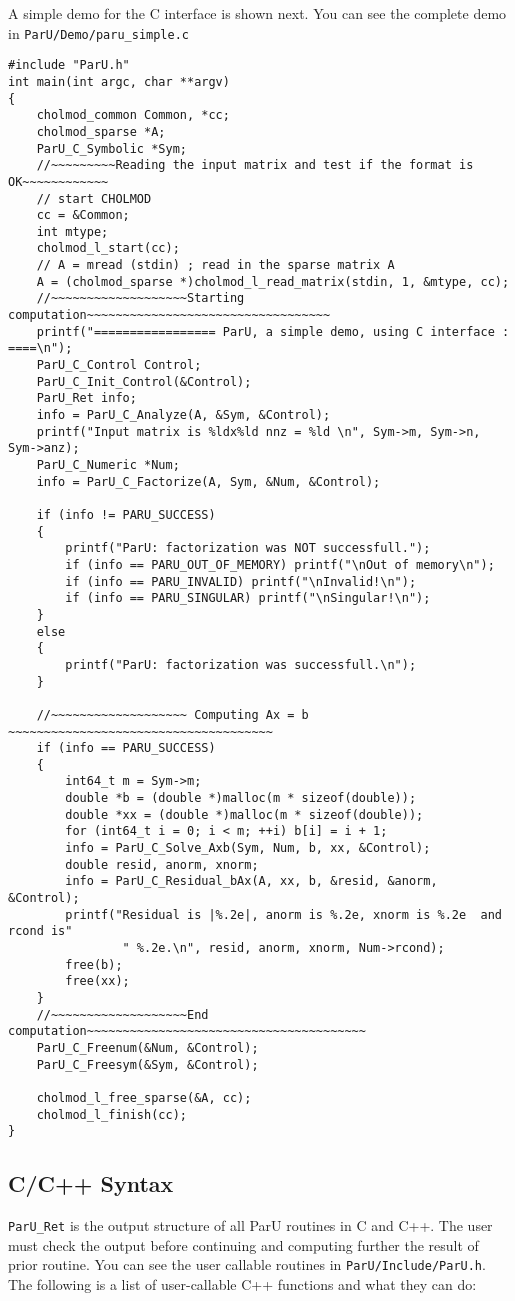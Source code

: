 \documentclass[12pt]{article}
\begin{document}
A simple demo for the C interface is shown next. You can see the complete demo
in \verb'ParU/Demo/paru_simple.c'
\begin{verbatim}
#include "ParU.h"
int main(int argc, char **argv)
{
    cholmod_common Common, *cc;
    cholmod_sparse *A;
    ParU_C_Symbolic *Sym;
    //~~~~~~~~~Reading the input matrix and test if the format is OK~~~~~~~~~~~~
    // start CHOLMOD
    cc = &Common;
    int mtype;
    cholmod_l_start(cc);
    // A = mread (stdin) ; read in the sparse matrix A
    A = (cholmod_sparse *)cholmod_l_read_matrix(stdin, 1, &mtype, cc);
    //~~~~~~~~~~~~~~~~~~~Starting computation~~~~~~~~~~~~~~~~~~~~~~~~~~~~~~~~~~
    printf("================= ParU, a simple demo, using C interface : ====\n");
    ParU_C_Control Control;
    ParU_C_Init_Control(&Control);
    ParU_Ret info;
    info = ParU_C_Analyze(A, &Sym, &Control);
    printf("Input matrix is %ldx%ld nnz = %ld \n", Sym->m, Sym->n, Sym->anz);
    ParU_C_Numeric *Num;
    info = ParU_C_Factorize(A, Sym, &Num, &Control);

    if (info != PARU_SUCCESS)
    {
        printf("ParU: factorization was NOT successfull.");
        if (info == PARU_OUT_OF_MEMORY) printf("\nOut of memory\n");
        if (info == PARU_INVALID) printf("\nInvalid!\n");
        if (info == PARU_SINGULAR) printf("\nSingular!\n");
    }
    else
    {
        printf("ParU: factorization was successfull.\n");
    }

    //~~~~~~~~~~~~~~~~~~~ Computing Ax = b ~~~~~~~~~~~~~~~~~~~~~~~~~~~~~~~~~~~~~
    if (info == PARU_SUCCESS)
    {
        int64_t m = Sym->m;
        double *b = (double *)malloc(m * sizeof(double));
        double *xx = (double *)malloc(m * sizeof(double));
        for (int64_t i = 0; i < m; ++i) b[i] = i + 1;
        info = ParU_C_Solve_Axb(Sym, Num, b, xx, &Control);
        double resid, anorm, xnorm;
        info = ParU_C_Residual_bAx(A, xx, b, &resid, &anorm, &Control);
        printf("Residual is |%.2e|, anorm is %.2e, xnorm is %.2e  and rcond is"
                " %.2e.\n", resid, anorm, xnorm, Num->rcond);
        free(b);
        free(xx);
    }
    //~~~~~~~~~~~~~~~~~~~End computation~~~~~~~~~~~~~~~~~~~~~~~~~~~~~~~~~~~~~~~
    ParU_C_Freenum(&Num, &Control);
    ParU_C_Freesym(&Sym, &Control);

    cholmod_l_free_sparse(&A, cc);
    cholmod_l_finish(cc);
}
\end{verbatim}

\subsection{C/C++ Syntax}
\verb'ParU_Ret' is the output structure of all ParU routines in C and C++.  The 
user must check the output before continuing and computing further the result of
prior routine. You can see the user callable routines in 
\verb'ParU/Include/ParU.h'.
The following is a list of user-callable C++ functions and what they
can do:
\end{document}
